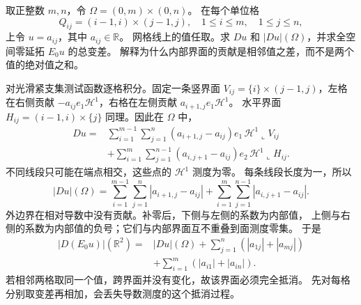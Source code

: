 \begin{exercise}\label{b1:ex:27-grid-interface-cancellation}
取正整数 \(m,n\)，令 \(\Omega=(0,m)\times(0,n)\)。
在每个单位格
\[
 Q_{ij}=(i-1,i)\times(j-1,j),\quad
 1\le i\le m,\quad1\le j\le n,
\]
上令 \(u=a_{ij}\)，其中 \(a_{ij}\in\mathbb R\)。
网格线上的值任取。求 \(Du\) 和 \(|Du|(\Omega)\)，并求全空间零延拓 \(E_0u\) 的总变差。
解释为什么内部界面的贡献是相邻值之差，而不是两个值的绝对值之和。
\end{exercise}
\begin{solution}
对光滑紧支集测试函数逐格积分。固定一条竖界面
\(V_{ij}=\{i\}\times(j-1,j)\)，左格在右侧贡献
\(-a_{ij}e_1\mathcal H^1\)，右格在左侧贡献
\(a_{i+1,j}e_1\mathcal H^1\)。
水平界面 \(H_{ij}=(i-1,i)\times\{j\}\) 同理。因此在 \(\Omega\) 中，
\[
 \begin{aligned}
 Du={}&\sum_{i=1}^{m-1}\sum_{j=1}^n
       (a_{i+1,j}-a_{ij})e_1\,\mathcal H^1\!\llcorner V_{ij}\\
 &+\sum_{i=1}^m\sum_{j=1}^{n-1}
       (a_{i,j+1}-a_{ij})e_2\,\mathcal H^1\!\llcorner H_{ij}.
 \end{aligned}
\]
不同线段只可能在端点相交，这些点的 \(\mathcal H^1\) 测度为零。
每条线段长度为一，所以
\[
 |Du|(\Omega)=
 \sum_{i=1}^{m-1}\sum_{j=1}^n|a_{i+1,j}-a_{ij}|
 +\sum_{i=1}^m\sum_{j=1}^{n-1}|a_{i,j+1}-a_{ij}|.
\]
外边界在相对导数中没有贡献。补零后，下侧与左侧的系数为内部值，
上侧与右侧的系数为内部值的负号；它们与内部界面互不重叠到面测度零集。
于是
\[
 \begin{aligned}
 |D(E_0u)|(\mathbb R^2)
 ={}&|Du|(\Omega)
    +\sum_{j=1}^n(|a_{1j}|+|a_{mj}|)\\
   &+\sum_{i=1}^m(|a_{i1}|+|a_{in}|).
 \end{aligned}
\]
若相邻两格取同一个值，跨界面并没有变化，故该界面必须完全抵消。
先对每格分别取变差再相加，会丢失导数测度的这个抵消过程。
\end{solution}


